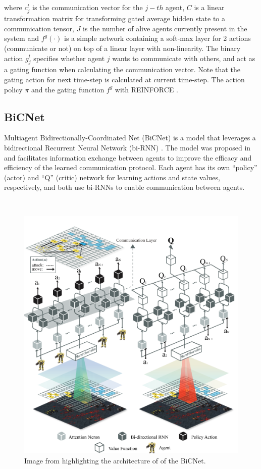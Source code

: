 \documentclass{article}
\begin{document}
where $c^t_j$ is the communication vector for the $j-th$ agent, $C$ is a linear transformation matrix for transforming gated average hidden state to a communication tensor, $J$ is the number of alive agents currently present in the system and $f^g(\cdot)$ is a simple network containing a soft-max layer for 2 actions (communicate or not) on top of a linear layer with non-linearity. The binary action $g^t_j$ specifies whether agent $j$ wants to communicate with others, and act as a gating function when calculating the communication vector. Note that the gating action for next time-step is calculated at current time-step. The action policy $\pi$ and the gating function $f^g$ with REINFORCE \cite{williams1992simple}.


\subsection{BiCNet}

Multiagent Bidirectionally-Coordinated Net (BiCNet) is a model that leverages a bidirectional Recurrent Neural Network (bi-RNN) \citep{chuster1997Bidirectional}. The model was proposed in \citet{peng2017bicnet} and facilitates information exchange between agents to improve the efficacy and efficiency of the learned communication protocol. Each agent has its own ``policy'' (actor) and ``Q'' (critic) network for learning actions and state values, respectively, and both use bi-RNNs to enable communication between agents.

\

\begin{figure}
	\centering
	\includegraphics[scale=0.5]{images/bicnet}
	\caption{Image from \citet{peng2017bicnet} highlighting the architecture of of the BiCNet.}
	\label{fig:ic3net.png}
\end{figure}
\end{document}
